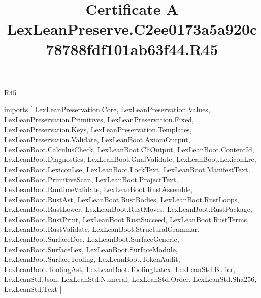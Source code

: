\begin{lexlean}{R45}
\title{Certificate A LexLeanPreserve.C2ee0173a5a920c78788fdf101ab63f44.R45}
\begin{coremodule}
imports [
  LexLeanPreservation.Core,
  LexLeanPreservation.Values,
  LexLeanPreservation.Primitives,
  LexLeanPreservation.Fixed,
  LexLeanPreservation.Keys,
  LexLeanPreservation.Templates,
  LexLeanPreservation.Validate,
  LexLeanBoot.AxiomOutput,
  LexLeanBoot.CalculusCheck,
  LexLeanBoot.CliOutput,
  LexLeanBoot.ContentId,
  LexLeanBoot.Diagnostics,
  LexLeanBoot.GnafValidate,
  LexLeanBoot.LexiconLre,
  LexLeanBoot.LexiconLse,
  LexLeanBoot.LockText,
  LexLeanBoot.ManifestText,
  LexLeanBoot.PrimitiveScan,
  LexLeanBoot.ProjectText,
  LexLeanBoot.RuntimeValidate,
  LexLeanBoot.RustAssemble,
  LexLeanBoot.RustAst,
  LexLeanBoot.RustBodies,
  LexLeanBoot.RustLoops,
  LexLeanBoot.RustLower,
  LexLeanBoot.RustMoves,
  LexLeanBoot.RustPackage,
  LexLeanBoot.RustPrint,
  LexLeanBoot.RustSucceed,
  LexLeanBoot.RustTerms,
  LexLeanBoot.RustValidate,
  LexLeanBoot.StructuralGrammar,
  LexLeanBoot.SurfaceDoc,
  LexLeanBoot.SurfaceGeneric,
  LexLeanBoot.SurfaceLex,
  LexLeanBoot.SurfaceModule,
  LexLeanBoot.SurfaceTooling,
  LexLeanBoot.TokenAudit,
  LexLeanBoot.ToolingAst,
  LexLeanBoot.ToolingLatex,
  LexLeanStd.Buffer,
  LexLeanStd.Json,
  LexLeanStd.Numeral,
  LexLeanStd.Order,
  LexLeanStd.Sha256,
  LexLeanStd.Text
]


\end{coremodule}
\end{lexlean}
